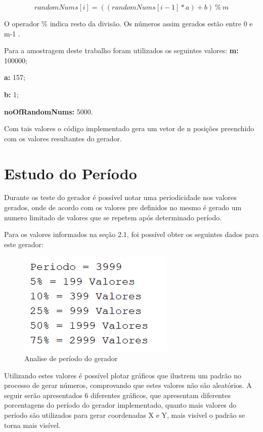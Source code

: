 \begin{equation}
            randomNums[i] = ((randomNums[i - 1] * a) + b) \ \% \ m
            \label{equ: equação congruencial linear}
\end{equation}

O operador \% indica resto da divisão. Os números assim gerados estão entre 0 e m-1 \cite{site3}.

Para a amostragem deste trabalho foram utilizados os seguintes valores:
\textbf{m: } 100000;

\textbf{a: } 157;

\textbf{b: } 1;

\textbf{noOfRandomNums: } 5000.

Com tais valores o código implementado gera um vetor de n posições preenchido com os valores resultantes do gerador.

\section{Estudo do Período}
Durante os teste do gerador é possível notar uma periodicidade nos valores gerados, onde de acordo com os valores pre definidos no mesmo é gerado um numero limitado de valores que se repetem após determinado período.

Para os valores informados na seção 2.1, foi possível obter os seguintes dados para este gerador:

\begin{figure}[ht]
    \centering
    \includegraphics{JoseGeraldo-lista2/fig/fig3.png}
    \caption{Analise de período do gerador}

\end{figure}

Utilizando estes valores é possível plotar gráficos que ilustrem um padrão no processo de gerar números, comprovando que estes valores não são aleatórios.
A seguir serão apresentados 6 diferentes gráficos, que apresentam diferentes porcentagens do período do gerador implementado, quanto mais valores do período são utilizados para gerar coordenadas X e Y, mais visível o padrão se torna mais visível.

